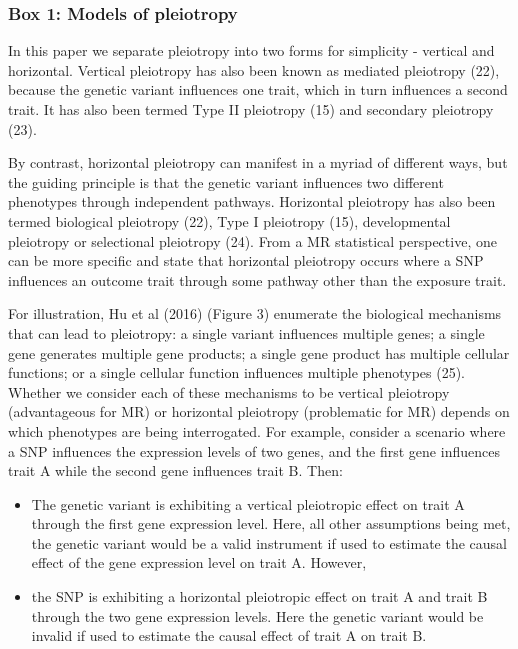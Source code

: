 \documentclass[]{article}
\providecommand{\tightlist}{%
  \setlength{\itemsep}{0pt}\setlength{\parskip}{0pt}}
\begin{document}
\subsubsection{Box 1: Models of
pleiotropy}\label{box-1-models-of-pleiotropy}

In this paper we separate pleiotropy into two forms for simplicity -
vertical and horizontal. Vertical pleiotropy has also been known as
mediated pleiotropy (22), because the genetic variant influences one
trait, which in turn influences a second trait. It has also been termed
Type II pleiotropy (15) and secondary pleiotropy (23).

By contrast, horizontal pleiotropy can manifest in a myriad of different
ways, but the guiding principle is that the genetic variant influences
two different phenotypes through independent pathways. Horizontal
pleiotropy has also been termed biological pleiotropy (22), Type I
pleiotropy (15), developmental pleiotropy or selectional pleiotropy
(24). From a MR statistical perspective, one can be more specific and
state that horizontal pleiotropy occurs where a SNP influences an
outcome trait through some pathway other than the exposure trait.

For illustration, Hu et al (2016) (Figure 3) enumerate the biological
mechanisms that can lead to pleiotropy: a single variant influences
multiple genes; a single gene generates multiple gene products; a single
gene product has multiple cellular functions; or a single cellular
function influences multiple phenotypes (25). Whether we consider each
of these mechanisms to be vertical pleiotropy (advantageous for MR) or
horizontal pleiotropy (problematic for MR) depends on which phenotypes
are being interrogated. For example, consider a scenario where a SNP
influences the expression levels of two genes, and the first gene
influences trait A while the second gene influences trait B. Then:

\begin{itemize}
\tightlist
\item
  The genetic variant is exhibiting a vertical pleiotropic effect on
  trait A through the first gene expression level. Here, all other
  assumptions being met, the genetic variant would be a valid instrument
  if used to estimate the causal effect of the gene expression level on
  trait A. However,
\item
  the SNP is exhibiting a horizontal pleiotropic effect on trait A and
  trait B through the two gene expression levels. Here the genetic
  variant would be invalid if used to estimate the causal effect of
  trait A on trait B.
\end{itemize}
\end{document}
